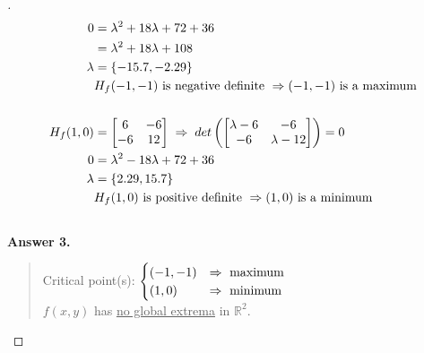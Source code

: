 \documentclass[12pt]{article}
\begin{document}
\begin{proof}[]
\begin{align*}
		0 &= \lambda^2 + 18\lambda + 72 + 36 \\
		 &= \lambda^2 + 18\lambda + 108 \\
		\lambda &= \left\lbrace -15.7, -2.29 \right\rbrace \\
		& H_f(-1, -1) \textnormal{ is negative definite } \Rightarrow (-1, -1) \textnormal{ is a maximum} \\[15pt]
		H_f(1, 0) &= \begin{bmatrix} 6 & -6 \\ -6 & 12 \end{bmatrix} \; \Rightarrow \; det\left( \begin{bmatrix} \lambda - 6 & - 6 \\ - 6 & \lambda - 12 \end{bmatrix} \right) = 0 \\
		0 &= \lambda^2 - 18\lambda + 72 + 36 \\
		\lambda &= \left\lbrace 2.29, 15.7 \right\rbrace \\
		& H_f(1, 0) \textnormal{ is positive definite } \Rightarrow (1, 0)  \textnormal{ is a minimum} \\[15pt]
	\end{align*}
	\textbf{Answer 3.} \vspace{-5mm} \\
	\begin{quote}
		Critical point(s): $ \begin{cases}
		(-1, -1) & \Rightarrow \textnormal{ maximum} \\
		(1, 0) & \Rightarrow \textnormal{ minimum}
		\end{cases}	$ \\
		$f(x,y)$ has \underline{no global extrema} in $\mathbb{R}^2$.
	\end{quote}
\end{proof}
\end{document}
